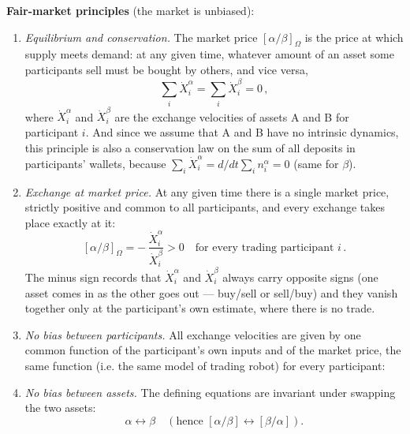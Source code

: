 \documentclass[letterpaper]{article}
\newcommand{\priceAB}{\left[\alpha / \beta\right]}
\newcommand{\priceBA}{\left[\beta / \alpha\right]}
\begin{document}
\textbf{Fair-market principles} (the market is unbiased):
\begin{enumerate}
    \item \emph{Equilibrium and conservation.} The market price $\priceAB_\Omega$ is the price at which supply meets demand: at any given time, whatever amount of an asset some participants sell must be bought by others, and vice versa,
    \begin{equation*}
        \sum_i \dot{X}_i^\alpha = \sum_i \dot{X}_i^\beta = 0\,,
    \end{equation*}
    where $\dot{X}_i^\alpha$ and $\dot{X}_i^\beta$ are the exchange velocities of assets A and B for participant $i$.
    And since we assume that A and B have no intrinsic dynamics, this principle is also a conservation law on the sum of all deposits in participants' wallets, because $\sum_i \dot{X}_i^\alpha = d/dt \sum_i n_i^\alpha = 0$ (same for $\beta$).
    \item \emph{Exchange at market price.} At any given time there is a single market price, strictly positive and common to all participants, and every exchange takes place exactly at it:
    \begin{equation*}
        \priceAB_\Omega = -\,\frac{\dot{X}_i^\alpha}{\dot{X}_i^\beta} > 0 \quad \text{for every trading participant } i\,.
    \end{equation*}
    The minus sign records that $\dot{X}_i^\alpha$ and $\dot{X}_i^\beta$ always carry opposite signs (one asset comes in as the other goes out --- buy/sell or sell/buy) and they vanish together only at the participant's own estimate, where there is no trade.
    \item \emph{No bias between participants.} All exchange velocities are given by one common function of the participant's own inputs and of the market price, the same function (i.e. the same model of trading robot) for every participant:
    \begin{center}
    \end{center}
    \item \emph{No bias between assets.} The defining equations are invariant under swapping the two assets:
    \begin{equation*}
        \alpha \leftrightarrow \beta \quad \left(\text{hence } \priceAB \leftrightarrow \priceBA\right).
    \end{equation*}
\end{enumerate}
\end{document}

